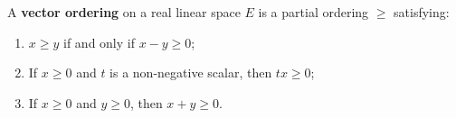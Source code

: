 A \textbf{vector ordering} on a real linear space $E$ is a partial ordering $\geq$ satisfying:
\begin{enumerate}
  \item $x \geq y$ if and only if $x - y \geq 0$;
  \item If $x \geq 0$ and $t$ is a non-negative scalar, then $tx \geq 0$;
  \item If $x \geq 0$ and $y \geq 0$, then $x + y \geq 0$.
\end{enumerate}

